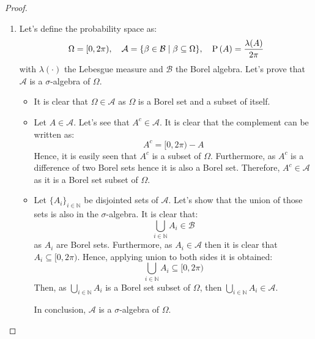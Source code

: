 \documentclass[11pt]{article}
\theoremstyle{definition}
\theoremstyle{remark}
\theoremstyle{remark}
\newcommand{\N}{\mathbb{N}}
\begin{document}
\begin{proof}
  \begin{enumerate}[label=\alph*)]
  \item Let's define the probability space as:
    \begin{equation*}
      \Omega = [0, 2\pi), \quad \mathcal{A} = \{\beta \in \mathcal{B} \mid
        \beta \subseteq \Omega\}, \quad \P{A} = \frac{\lambda(A)}{2\pi}
      \end{equation*}
      with $\lambda(\cdot)$ the Lebesgue measure and $\mathcal{B}$ the
      Borel algebra. Let's prove that $\mathcal{A}$ is a
      $\sigma$-algebra of $\Omega$.
      \begin{itemize}
      \item It is clear that $\Omega \in \mathcal{A}$ as $\Omega$ is a
        Borel set and a subset of itself.

      \item Let $A \in \mathcal{A}$. Let's see that
        $A^c \in \mathcal{A}$. It is clear that the complement can be
        written as:
        \begin{equation*}
          A^c = [0, 2\pi) - A
        \end{equation*}
        Hence, it is easily seen that $A^c$ is a subset of
        $\Omega$. Furthermore, as $A^c$ is a difference of two Borel
        sets hence it is also a Borel set. Therefore,
        $A^c \in \mathcal{A}$ as it is a Borel set subset of $\Omega$.

      \item Let $\{A_i\}_{i \in \N}$ be disjointed sets of
        $\mathcal{A}$. Let's show that the union of those sets is also
        in the $\sigma$-algebra. It is clear that:
        \begin{equation*}
          \bigcup_{i \in \N} A_i \in \mathcal{B}
        \end{equation*}
        as $A_i$ are Borel sets. Furthermore, as $A_i \in \mathcal{A}$
        then it is clear that $A_i \subseteq [0, 2\pi)$. Hence,
        applying union to both sides it is obtained:
        \begin{equation*}
          \bigcup_{i \in \N} A_i \subseteq [0, 2\pi)
        \end{equation*}
        Then, as $\bigcup\limits_{i \in \N} A_i$ is a Borel set subset of
        $\Omega$, then $\bigcup\limits_{i \in \N} A_i \in \mathcal{A}$.

        In conclusion, $\mathcal{A}$ is a $\sigma$-algebra of
        $\Omega$.
      \end{itemize}


\end{enumerate}
\end{proof}
\end{document}
